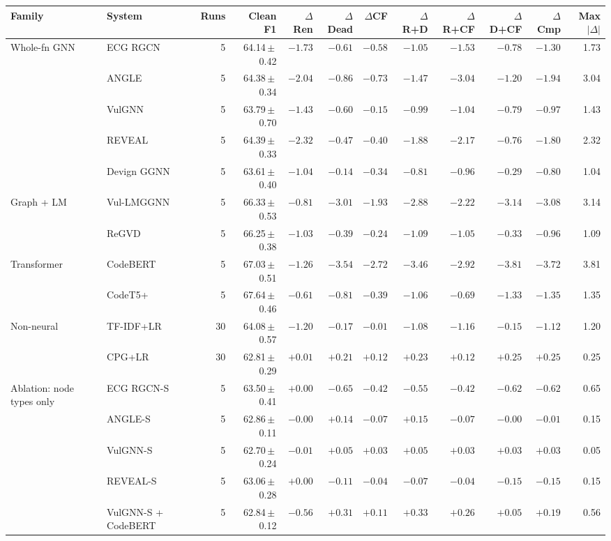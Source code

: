 \begin{tabular}{llrrrrrrrrrr}
\toprule
Family & System & Runs & Clean F1 & $\Delta$Ren & $\Delta$Dead & $\Delta$CF & $\Delta$R+D & $\Delta$R+CF & $\Delta$D+CF & $\Delta$Cmp & Max$|\Delta|$ \\
\midrule
Whole-fn GNN & ECG RGCN & 5 & 64.14\,$\pm$\,0.42 & $\mathbf{-1.73}$ & $\mathbf{-0.61}$ & $-0.58$ & $\mathbf{-1.05}$ & $\mathbf{-1.53}$ & $\mathbf{-0.78}$ & $\mathbf{-1.30}$ & 1.73 \\
 & ANGLE & 5 & 64.38\,$\pm$\,0.34 & $\mathbf{-2.04}$ & $-0.86$ & $-0.73$ & $\mathbf{-1.47}$ & $-3.04$ & $\mathbf{-1.20}$ & $\mathbf{-1.94}$ & 3.04 \\
 & VulGNN & 5 & 63.79\,$\pm$\,0.70 & $\mathbf{-1.43}$ & $-0.60$ & $-0.15$ & $-0.99$ & $-1.04$ & $-0.79$ & $-0.97$ & 1.43 \\
 & REVEAL & 5 & 64.39\,$\pm$\,0.33 & $\mathbf{-2.32}$ & $-0.47$ & $-0.40$ & $\mathbf{-1.88}$ & $\mathbf{-2.17}$ & $-0.76$ & $\mathbf{-1.80}$ & 2.32 \\
 & Devign GGNN & 5 & 63.61\,$\pm$\,0.40 & $-1.04$ & $-0.14$ & $\mathbf{-0.34}$ & $-0.81$ & $-0.96$ & $-0.29$ & $-0.80$ & 1.04 \\
\midrule
Graph + LM & Vul-LMGGNN & 5 & 66.33\,$\pm$\,0.53 & $-0.81$ & $\mathbf{-3.01}$ & $\mathbf{-1.93}$ & $\mathbf{-2.88}$ & $\mathbf{-2.22}$ & $\mathbf{-3.14}$ & $\mathbf{-3.08}$ & 3.14 \\
 & ReGVD & 5 & 66.25\,$\pm$\,0.38 & $\mathbf{-1.03}$ & $-0.39$ & $-0.24$ & $\mathbf{-1.09}$ & $\mathbf{-1.05}$ & $-0.33$ & $-0.96$ & 1.09 \\
\midrule
Transformer & CodeBERT & 5 & 67.03\,$\pm$\,0.51 & $\mathbf{-1.26}$ & $\mathbf{-3.54}$ & $\mathbf{-2.72}$ & $\mathbf{-3.46}$ & $\mathbf{-2.92}$ & $\mathbf{-3.81}$ & $\mathbf{-3.72}$ & 3.81 \\
 & CodeT5+ & 5 & 67.64\,$\pm$\,0.46 & $-0.61$ & $-0.81$ & $-0.39$ & $-1.06$ & $-0.69$ & $-1.33$ & $-1.35$ & 1.35 \\
\midrule
Non-neural & TF-IDF+LR & 30 & 64.08\,$\pm$\,0.57 & $\mathbf{-1.20}$ & $-0.17$ & $-0.01$ & $\mathbf{-1.08}$ & $\mathbf{-1.16}$ & $-0.15$ & $\mathbf{-1.12}$ & 1.20 \\
 & CPG+LR & 30 & 62.81\,$\pm$\,0.29 & $+0.01$ & $+0.21$ & $+0.12$ & $+0.23$ & $+0.12$ & $+0.25$ & $+0.25$ & 0.25 \\
\midrule
Ablation: node types only & ECG RGCN-S & 5 & 63.50\,$\pm$\,0.41 & $+0.00$ & $-0.65$ & $-0.42$ & $-0.55$ & $-0.42$ & $-0.62$ & $-0.62$ & 0.65 \\
 & ANGLE-S & 5 & 62.86\,$\pm$\,0.11 & $-0.00$ & $+0.14$ & $-0.07$ & $+0.15$ & $-0.07$ & $-0.00$ & $-0.01$ & 0.15 \\
 & VulGNN-S & 5 & 62.70\,$\pm$\,0.24 & $-0.01$ & $+0.05$ & $+0.03$ & $+0.05$ & $+0.03$ & $+0.03$ & $+0.03$ & 0.05 \\
 & REVEAL-S & 5 & 63.06\,$\pm$\,0.28 & $+0.00$ & $-0.11$ & $-0.04$ & $-0.07$ & $-0.04$ & $-0.15$ & $-0.15$ & 0.15 \\
 & VulGNN-S + CodeBERT & 5 & 62.84\,$\pm$\,0.12 & $-0.56$ & $\mathbf{+0.31}$ & $+0.11$ & $\mathbf{+0.33}$ & $\mathbf{+0.26}$ & $+0.05$ & $+0.19$ & 0.56 \\
\bottomrule
\end{tabular}
